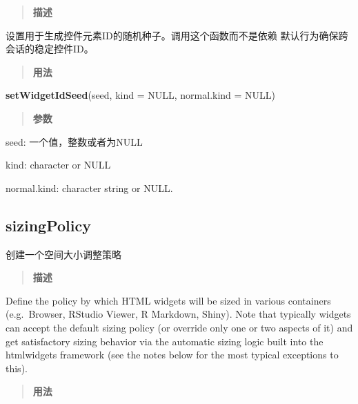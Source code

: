 \documentclass[]{book}
\newenvironment{Shaded}{\begin{snugshade}}{\end{snugshade}}
\newcommand{\KeywordTok}[1]{\textcolor[rgb]{0.13,0.29,0.53}{\textbf{#1}}}
\newcommand{\DataTypeTok}[1]{\textcolor[rgb]{0.13,0.29,0.53}{#1}}
\newcommand{\OtherTok}[1]{\textcolor[rgb]{0.56,0.35,0.01}{#1}}
\newcommand{\NormalTok}[1]{#1}
\theoremstyle{definition}
\theoremstyle{definition}
\theoremstyle{definition}
\theoremstyle{remark}
\begin{document}
\begin{quote}
\textbf{描述}
\end{quote}

设置用于生成控件元素ID的随机种子。调用这个函数而不是依赖
默认行为确保跨会话的稳定控件ID。

\begin{quote}
\textbf{用法}
\end{quote}

\begin{Shaded}
\begin{Highlighting}[]
\KeywordTok{setWidgetIdSeed}\NormalTok{(seed, }\DataTypeTok{kind =} \OtherTok{NULL}\NormalTok{, }\DataTypeTok{normal.kind =} \OtherTok{NULL}\NormalTok{)}
\end{Highlighting}
\end{Shaded}

\begin{quote}
\textbf{参数}
\end{quote}

seed: 一个值，整数或者为NULL

kind: character or NULL

normal.kind: character string or NULL.

\subsection{sizingPolicy}\label{sizingpolicy}

创建一个空间大小调整策略

\begin{quote}
\textbf{描述}
\end{quote}

Define the policy by which HTML widgets will be sized in various
containers (e.g.~Browser, RStudio Viewer, R Markdown, Shiny). Note that
typically widgets can accept the default sizing policy (or override only
one or two aspects of it) and get satisfactory sizing behavior via the
automatic sizing logic built into the htmlwidgets framework (see the
notes below for the most typical exceptions to this).

\begin{quote}
\textbf{用法}
\end{quote}
\end{document}
